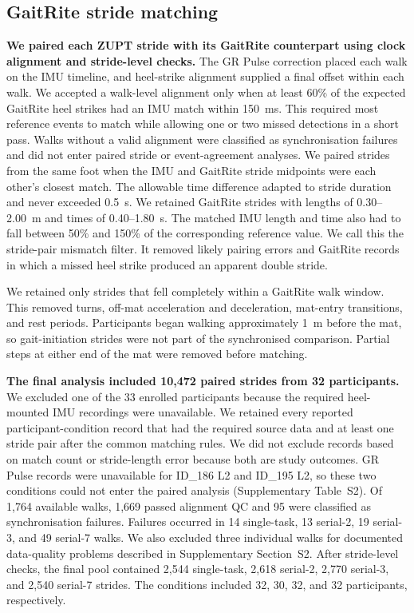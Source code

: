 \documentclass[11pt]{article}
\begin{document}
\subsection{GaitRite stride matching}\label{sec:matching}

\textbf{We paired each ZUPT stride with its GaitRite counterpart using clock alignment and stride-level checks.} The GR Pulse correction placed each walk on the IMU timeline, and heel-strike alignment supplied a final offset within each walk. We accepted a walk-level alignment only when at least 60\% of the expected GaitRite heel strikes had an IMU match within 150~ms. This required most reference events to match while allowing one or two missed detections in a short pass. Walks without a valid alignment were classified as synchronisation failures and did not enter paired stride or event-agreement analyses. We paired strides from the same foot when the IMU and GaitRite stride midpoints were each other's closest match. The allowable time difference adapted to stride duration and never exceeded 0.5~s. We retained GaitRite strides with lengths of 0.30--2.00~m and times of 0.40--1.80~s. The matched IMU length and time also had to fall between 50\% and 150\% of the corresponding reference value. We call this the stride-pair mismatch filter. It removed likely pairing errors and GaitRite records in which a missed heel strike produced an apparent double stride.

We retained only strides that fell completely within a GaitRite walk window. This removed turns, off-mat acceleration and deceleration, mat-entry transitions, and rest periods. Participants began walking approximately 1~m before the mat, so gait-initiation strides were not part of the synchronised comparison. Partial steps at either end of the mat were removed before matching.

\textbf{The final analysis included 10{,}472 paired strides from 32 participants.} We excluded one of the 33 enrolled participants because the required heel-mounted IMU recordings were unavailable. We retained every reported participant-condition record that had the required source data and at least one stride pair after the common matching rules. We did not exclude records based on match count or stride-length error because both are study outcomes. GR Pulse records were unavailable for ID\_186 L2 and ID\_195 L2, so these two conditions could not enter the paired analysis (Supplementary Table~S2). Of 1{,}764 available walks, 1{,}669 passed alignment QC and 95 were classified as synchronisation failures. Failures occurred in 14 single-task, 13 serial-2, 19 serial-3, and 49 serial-7 walks. We also excluded three individual walks for documented data-quality problems described in Supplementary Section~S2. After stride-level checks, the final pool contained 2{,}544 single-task, 2{,}618 serial-2, 2{,}770 serial-3, and 2{,}540 serial-7 strides. The conditions included 32, 30, 32, and 32 participants, respectively.
\end{document}
